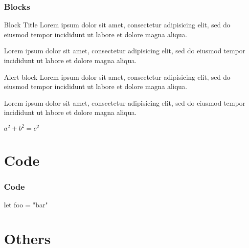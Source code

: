 \documentclass[aspectratio=169]{beamer}
\begin{document}
\begin{frame}[t]
  \frametitle{Blocks}
  \begin{block}{Block Title}
    Lorem ipsum dolor sit amet, consectetur adipisicing elit,
    sed do eiusmod tempor incididunt ut labore et
    dolore magna aliqua.
  \end{block}

  \begin{example}
    Lorem ipsum dolor sit amet, consectetur adipisicing elit,
    sed do eiusmod tempor incididunt ut labore et
    dolore magna aliqua.
  \end{example}

  \begin{alertblock}{Alert block}
    Lorem ipsum dolor sit amet, consectetur adipisicing elit,
    sed do eiusmod tempor incididunt ut labore et
    dolore magna aliqua.
  \end{alertblock}
\end{frame}
\begin{frame}[t]

  \begin{definition}
    Lorem ipsum dolor sit amet, consectetur adipisicing elit,
    sed do eiusmod tempor incididunt ut labore et
    dolore magna aliqua.
  \end{definition}
  \begin{theorem}
    $ a^2 + b^2 = c^2$
  \end{theorem}
\end{frame}

\section{Code}

\begin{frame}

  \frametitle{Code}
  \begin{semiverbatim}
let foo = "bar"
  \end{semiverbatim}
\end{frame}

\section{Others}
\end{document}
